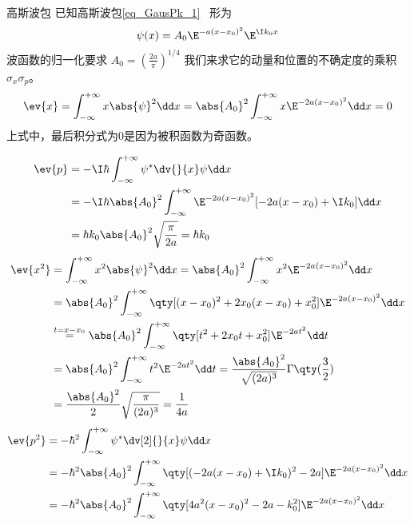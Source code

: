 \begin{example}{高斯波包}\label{ex_Uncert_1}
已知高斯波包\autoref{eq_GausPk_1}~ 形为
\begin{equation}
\psi(x)=A_0\E^{-a(x-x_0)^2}\E^{\I k_0x}
\end{equation}
波函数的归一化要求 $A_0=(\frac{2a}{\pi})^{1/4}$
我们来求它的动量和位置的不确定度的乘积 $\sigma_x\sigma_p$。
\begin{equation}\label{eq_Uncert_4}
\ev{x}=\int_{-\infty}^{+\infty}x\abs{\psi}^2\dd x=\abs{A_0}^2\int_{-\infty}^{+\infty}x\E^{-2a(x-x_0)^2}\dd x=0
\end{equation}
上式中，最后积分式为0是因为被积函数为奇函数。

\begin{equation}
\begin{aligned}
\ev{p}&=-\I\hbar\int_{-\infty}^{+\infty}\psi^{*}\dv{}{x}\psi\dd x\\
&=-\I\hbar\abs{A_0}^2\int_{-\infty}^{+\infty}\E^{-2a(x-x_0)^2}[-2a(x-x_0)+\I k_0]\dd x\\
&=\hbar k_0\abs{A_0}^2\sqrt{\frac{\pi}{2a}}=\hbar k_0
\end{aligned}
\end{equation}
\begin{equation}
\begin{aligned}
\ev{x^2}&=\int_{-\infty}^{+\infty}x^2\abs{\psi}^2\dd x=\abs{A_0}^2\int_{-\infty}^{+\infty}x^2\E^{-2a(x-x_0)^2}\dd x\\
&=\abs{A_0}^2\int_{-\infty}^{+\infty}\qty[(x-x_0)^2+2x_0(x-x_0)+x_0^2]\E^{-2a(x-x_0)^2}\dd x\\
&\overset{t=x-x_0}{=}\abs{A_0}^2\int_{-\infty}^{+\infty}\qty[t^2+2x_0t+x_0^2]\E^{-2at^2}\dd t\\
&=\abs{A_0}^2\int_{-\infty}^{+\infty}t^2\E^{-2at^2}\dd t
=\frac{\abs{A_0}^2}{\sqrt{(2a)^3}}\Gamma\qty(\frac{3}{2})\\
&=\frac{\abs{A_0}^2}{2}\sqrt{\frac{\pi}{(2a)^3}}=\frac{1}{4a}
\end{aligned}
\end{equation}
\begin{equation}
\begin{aligned}
\ev{p^2}&=-\hbar^2 \int_{-\infty}^{+\infty}\psi^{*}\dv[2]{}{x}\psi\dd x\\
&=-\hbar^2\abs{A_0}^2\int_{-\infty}^{+\infty}\qty[(-2a(x-x_0)+\I k_0)^2-2a]\E^{-2a(x-x_0)^2}\dd x\\
&=-\hbar^2\abs{A_0}^2\int_{-\infty}^{+\infty}\qty[4a^2(x-x_0)^2-2a-k_0^2]\E^{-2a(x-x_0)^2}\dd x\\

\end{aligned}
\end{equation}
\end{example}
